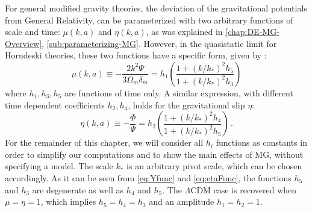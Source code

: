 For general modified gravity theories, the deviation
of the gravitational potentials from General Relativity,
can be parameterized with two arbitrary functions
of scale and time: $\mu(k,a)$ and $\eta(k,a)$,
as was explained in \cref{chap:DE-MG-Overview}, \cref{sub:parameterizing-MG}.
However, in the quasistatic limit for Horndeski theories, these two functions have a specific form, given by : 
\begin{equation}
\mu(k,a)\equiv-\frac{2k^{2}\Psi}{3\Omega_{m}\delta_{m}}=h_{1}\left(\frac{1+(k/k_{*})^{2}h_{5}}{1+(k/k_{*})^{2}h_{3}}\right)\label{eq:mufunc}
\end{equation}
where $h_{1},h_{3},h_{5}$ are functions of time only. A similar expression,
with different time dependent coefficients $h_{2},h_{4}$, holds for
the gravitational slip $\eta$: 
\begin{equation}
\eta(k,a)\equiv-\frac{\Phi}{\Psi}=h_{2}\left(\frac{1+(k/k_{*})^{2}h_{4}}{1+(k/k_{*})^{2}h_{5}}\right)\,.\label{eq:etaFunc}
\end{equation}
For the remainder of this chapter, we will consider all $h_{i}$ functions as constants in order to simplify our computations and to show the main effects of MG, without specifying
a model. The scale $k_{*}$ is an arbitrary pivot scale, which can be chosen accordingly.
As it can be seen from  \cref{eq:Yfunc} and \cref{eq:etaFunc},
the functions $h_{5}$ and $h_{3}$ are degenerate as well as $h_{4}$
and $h_{5}$. The $\Lambda\textrm{CDM}$ case is recovered when $\mu=\eta=1$, which
implies $h_{5}=h_{4}=h_{3}$ and an amplitude $h_{1}=h_{2}=1$.

